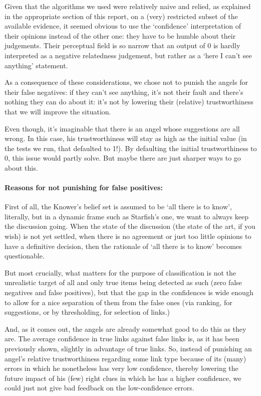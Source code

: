 \documentclass[11pt]{article}
\begin{document}
Given that the algorithms we used were relatively naive and relied, as explained in the appropriate section of this report, on a (very) restricted subset of the available evidence, it seemed obvious to use the `confidence' interpretation of their opinions instead of the other one: they have to be humble about their judgements. Their perceptual field is so narrow that an output of 0 is hardly interpreted as a negative relatedness judgement, but rather as a `here I can't see anything' statement.

As a consequence of these considerations, we chose not to punish the angels for their false negatives: if they can't see anything, it's not their fault and there's nothing they can do about it: it's not by lowering their (relative) trustworthiness that we will improve the situation.

Even though, it's imaginable that there is an angel whose suggestions are all wrong. In this case, his trustworthiness will stay as high as the initial value (in the tests we run, that defaulted to 1!). By defaulting the initial trustworthiness to 0, this issue would partly solve. But maybe there are just sharper ways to go about this.

\paragraph{Reasons for not punishing for false positives:}

First of all, the Knower's belief set is assumed to be `all there is to know', literally, but in a dynamic frame such as Starfish's one, we want to always keep the discussion going. When the state of the discussion (the state of the art, if you wish) is not yet settled, when there is no agreement or just too little opinions to have a definitive decision, then the rationale of `all there is to know' becomes questionable.

But most crucially, what matters for the purpose of classification is not the unrealistic target of all and only true items being detected as such (zero false negatives and false positives), but that the gap in the confidences is wide enough to allow for a nice separation of them from the false ones (via ranking, for suggestions, or by thresholding, for selection of links.)

And, as it comes out, the angels are already somewhat good to do this as they are. The average confidence in true links against false links is, as it has been previously shown, slightly in advantage of true links. So, instead of punishing an angel's relative trustworthiness regarding some link type because of its (many) errors in which he nonetheless has very low confidence, thereby lowering the future impact of his (few) right clues in which he has a higher confidence, we could just not give bad feedback on the low-confidence errors.
\end{document}
